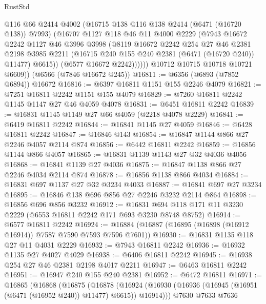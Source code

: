 \begin{lexlean}{RustStd}
\begin{coremodule}
                @116
                @66
                @2414
                @4002
                (@16715 @138 @116 @138 @2414 (@6471 (@16720 @138)) @7993)
                (@16707
                  @1127
                  @118
                  @46
                  @11
                  @4000
                  @2229
                  (@7943
                    @16672
                    @2242
                    @1127
                    @46
                    @3996
                    @3998
                    (@8119
                      @16672
                      @2242
                      @254
                      @27
                      @46
                      @2381
                      @2198
                      @3985
                      @2211
                      (@16715 @240 @155 @240 @2381 (@6471 (@16720 @240)) @11477)
                      @6615))
                  (@6577 @16672 @2242))))))
        @10712
        @10715
        @10718
        @10721
        @6609))
    (@6566 (@7846 @16672 @245))
@16811 := @6356 (@6893 (@7852 @6894)) @16672
@16816 := @6397 @16811 @1151 @155 @2246 @4079
@16821 := @7251 @16811 @2242 @1151 @155 @4079
@16829 := @7260 @16811 @2242 @1145 @1147 @27 @46 @4059 @4078
@16831 := @6451 @16811 @2242
@16839 := @16831 @1145 @1149 @27 @66 @4059 (@2218 @4078 @2229)
@16841 := @6419 @16811 @2242
@16844 := @16841 @1145 @27 @4059
@16846 := @6428 @16811 @2242
@16847 := @16846 @143
@16854 := @16847 @1144 @866 @27 @2246 @4057 @2114 @874
@16856 := @6442 @16811 @2242
@16859 := @16856 @1144 @866 @4057
@16865 := @16831 @1139 @1143 @27 @32 @4036 @4056
@16868 := @16841 @1139 @27 @4036
@16875 := @16847 @1138 @866 @27 @2246 @4034 @2114 @874
@16878 := @16856 @1138 @866 @4034
@16884 := @16831 @697 @1137 @27 @32 @3234 @4033
@16887 := @16841 @697 @27 @3234
@16895 := @16846 @138 @696 @856 @27 @2246 @3232 @2114 @864
@16898 := @16856 @696 @856 @3232
@16912 := @16831 @694 @118 @171 @11 @3230 @2229 (@6553 @16811 @2242 @171 @693 @3230 @8748 @8752)
@16914 := @6577 @16811 @2242
@16924 := @16884 (@16887 (@16895 (@16898 (@16912 @16914)) @7587 @7590 @7593 @7596 @7601))
@16930 := @16831 @1135 @118 @27 @11 @4031 @2229
@16932 := @7943 @16811 @2242
@16936 := @16932 @1135 @27 @4027 @4029
@16938 := @6406 @16811 @2242
@16945 := @16938 @254 @27 @46 @2381 @2198 @4017 @2211
@16947 := @6463 @16811 @2242
@16951 := @16947 @240 @155 @240 @2381
@16952 := @6472 @16811
@16971 := @16865
    (@16868
      (@16875
        (@16878
          (@16924 (@16930 (@16936 (@16945 (@16951 (@6471 (@16952 @240)) @11477) @6615)) @16914)))
        @7630
        @7633
        @7636

\end{coremodule}
\end{lexlean}
